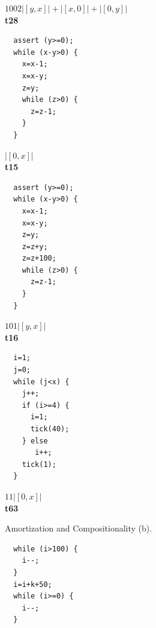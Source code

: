 \documentclass[nocopyrightspace,preprint,pldi]{sigplanconf-pldi15}
\begin{document}
{\begin{figure}
\begin{minipage}[b]{\progwidth}
\begin{center}
$1002|[y,x]|+|[x,0]|+|[0,y]|$
\\[.7\baselineskip]
      {\bf t28}
    \end{center}
  \end{minipage}%
%
%
  \begin{minipage}[b]{\progwidth}
    \begin{center}
   \begin{lstlisting}
  assert (y>=0);
  while (x-y>0) {
    x=x-1;
    x=x-y;
    z=y;
    while (z>0) {
      z=z-1;
    }
  }
   \end{lstlisting}

$|[0,x]|$
\\[.7\baselineskip]
      {\bf t15}
    \end{center}
  \end{minipage}
%
%
  \begin{minipage}[b]{\progwidth}
    \begin{center}
   \begin{lstlisting}
  assert (y>=0);
  while (x-y>0) {
    x=x-1;
    x=x-y;
    z=y;
    z=z+y;
    z=z+100;
    while (z>0) {
      z=z-1;
    }
  }
   \end{lstlisting}

$101|[y,x]|$
\\[.7\baselineskip]
      {\bf t16}
    \end{center}
  \end{minipage}
%
%
  \begin{minipage}[b]{\progwidth}
    \begin{center}
   \begin{lstlisting}
  i=1;
  j=0;
  while (j<x) {
    j++;
    if (i>=4) {
      i=1;
      tick(40);
    } else
       i++;
    tick(1);
  }
   \end{lstlisting}

$11|[0,x]|$
\\[.7\baselineskip]
      {\bf t63}
    \end{center}
  \end{minipage}


   \caption{Amortization and Compositionality (b).}
  \label{fig:cat1b}
\end{figure}


\begin{figure}
 \setlength{\progwidth}{.24\linewidth}
  \centering

  \begin{minipage}[b]{\progwidth}
    \begin{center}
   \begin{lstlisting}
  while (i>100) {
    i--;
  }
  i=i+k+50;
  while (i>=0) {
    i--;
  }
   \end{lstlisting}


\end{center}
\end{minipage}
\end{figure}}
\end{document}
